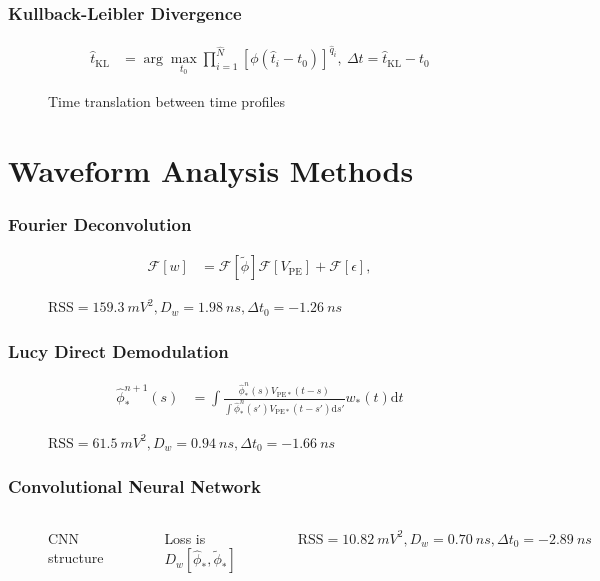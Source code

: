 \documentclass{beamer}
\begin{document}
\begin{frame}
\frametitle{Kullback-Leibler Divergence}
\begin{align*}
  \hat{t}_\mathrm{KL} &= \arg\underset{t_0}{\max} \prod_{i=1}^{\hat{N}} \left[\phi(\hat{t}_i-t_0)\right]^{\hat{q}_i} ,\ \Delta t = \hat{t}_\mathrm{KL} - t_0
\end{align*}
\begin{figure}
    \centering
    \resizebox{0.6\textwidth}{!}{}
    \caption{Time translation between time profiles}
\end{figure}
\end{frame}

\section{Waveform Analysis Methods}

\begin{frame}
\frametitle{Fourier Deconvolution}
\begin{align*}
  \mathcal{F}[w] &= \mathcal{F}[\tilde{\phi}]\mathcal{F}[V_\mathrm{PE}] + \mathcal{F}[\epsilon],
\end{align*}
\begin{figure}
    \centering
    \resizebox{0.6\textwidth}{!}{}
    \caption{$\mathrm{RSS}=\SI{159.3}{mV^2},D_w=\SI{1.98}{ns},\Delta t_0=\SI{-1.26}{ns}$}
\end{figure}
\end{frame}

\begin{frame}
\frametitle{Lucy Direct Demodulation}
\begin{align*}
  \hat{\phi}_*^{n+1}(s) &= \int \frac{\hat{\phi}_*^n(s) V_{\mathrm{PE}*}(t-s)}{\int\hat{\phi}_*^n(s') V_{\mathrm{PE}*}(t-s')\mathrm{d}s'} w_*(t) \mathrm{d}t
\end{align*}
\begin{figure}
    \centering
    \resizebox{0.6\textwidth}{!}{}
    \caption{$\mathrm{RSS}=\SI{61.5}{mV^2},D_w=\SI{0.94}{ns},\Delta t_0=\SI{-1.66}{ns}$}
\end{figure}
\end{frame}

\begin{frame}
\frametitle{Convolutional Neural Network}
\begin{columns}
\begin{figure}
    \centering
    \begin{adjustbox}{width=0.65\textwidth}
        
    \end{adjustbox}
    \caption{CNN structure}
\end{figure}
\begin{center}
    Loss is $D_w[\hat{\phi}_*, \tilde{\phi}_*]$
\end{center}
\begin{figure}
    \centering
    \resizebox{\textwidth}{!}{}
    \caption{$\mathrm{RSS}=\SI{10.82}{mV^2},D_w=\SI{0.70}{ns},\Delta t_0=\SI{-2.89}{ns}$}
\end{figure}
\end{columns}
\end{frame}
\end{document}
